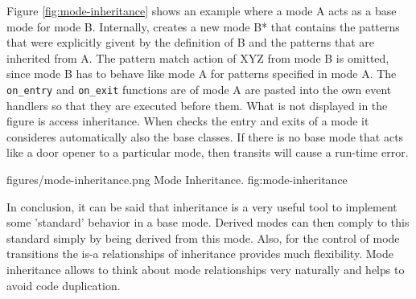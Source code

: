 Figure \ref{fig:mode-inheritance} shows an example where a mode A acts as a
base mode for mode B. Internally, {\quex} creates a new mode B* that contains
the patterns that were explicitly givent by the definition of B and the
patterns that are inherited from A. The pattern match action of {\sf XYZ} from
mode B is omitted, since mode B has to behave like mode A for patterns
specified in mode A. The {\tt on\_entry} and {\tt on\_exit} functions are of
mode A are pasted into the own event handlers so that they are executed before
them. What is not displayed in the figure is access inheritance. When {\Quex}
checks the entry and exits of a mode it consideres automatically also the
base classes. If there is no base mode that acts like a door opener to a
particular mode, then transits will cause a run-time error.

\showpic
{figures/mode-inheritance.png}
{Mode Inheritance.}
{fig:mode-inheritance}

In conclusion, it can be said that inheritance is a very useful tool to
implement some 'standard' behavior in a base mode. Derived modes can then
comply to this standard simply by being derived from this mode. Also, for the
control of mode transitions the is-a relationships of inheritance provides
much flexibility. Mode inheritance allows to think about mode relationships
very naturally and helps to avoid code duplication.
